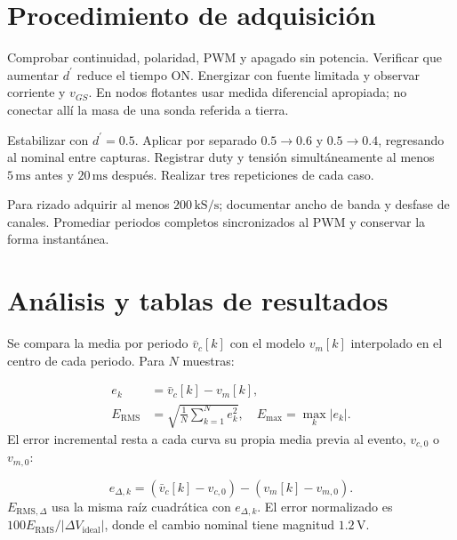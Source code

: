 \documentclass[conference,letterpaper]{IEEEtran}
\begin{document}
\section{Procedimiento de adquisición}
Comprobar continuidad, polaridad, PWM y apagado sin potencia. Verificar que aumentar $d^{\prime}$ reduce el tiempo ON. Energizar con fuente limitada y observar corriente y $v_{GS}$. En nodos flotantes usar medida diferencial apropiada; no conectar allí la masa de una sonda referida a tierra.

Estabilizar con $d^{\prime}=0.5$. Aplicar por separado $0.5\to0.6$ y $0.5\to0.4$, regresando al nominal entre capturas. Registrar duty y tensión simultáneamente al menos $5\,\mathrm{ms}$ antes y $20\,\mathrm{ms}$ después. Realizar tres repeticiones de cada caso.

Para rizado adquirir al menos $200\,\mathrm{kS/s}$; documentar ancho de banda y desfase de canales. Promediar periodos completos sincronizados al PWM y conservar la forma instantánea.

\section{Análisis y tablas de resultados}
Se compara la media por periodo $\bar v_c[k]$ con el modelo $v_m[k]$ interpolado en el centro de cada periodo. Para $N$ muestras:

\begin{equation}\label{eq:errors}\begin{aligned}e_k&=\bar v_c[k]-v_m[k],\\E_{\mathrm{RMS}}&=\sqrt{\frac1N\sum_{k=1}^N e_k^2},\quad E_{\max}=\max_k|e_k|.\end{aligned}\end{equation}
El error incremental resta a cada curva su propia media previa al evento, $v_{c,0}$ o $v_{m,0}$:

\begin{equation}\label{eq:incremental}e_{\Delta,k}=(\bar v_c[k]-v_{c,0})-(v_m[k]-v_{m,0}).\end{equation}
$E_{\mathrm{RMS},\Delta}$ usa la misma raíz cuadrática con $e_{\Delta,k}$. El error normalizado es $100E_{\mathrm{RMS}}/|\Delta V_{\mathrm{ideal}}|$, donde el cambio nominal tiene magnitud $1.2\,\mathrm{V}$.
\end{document}
